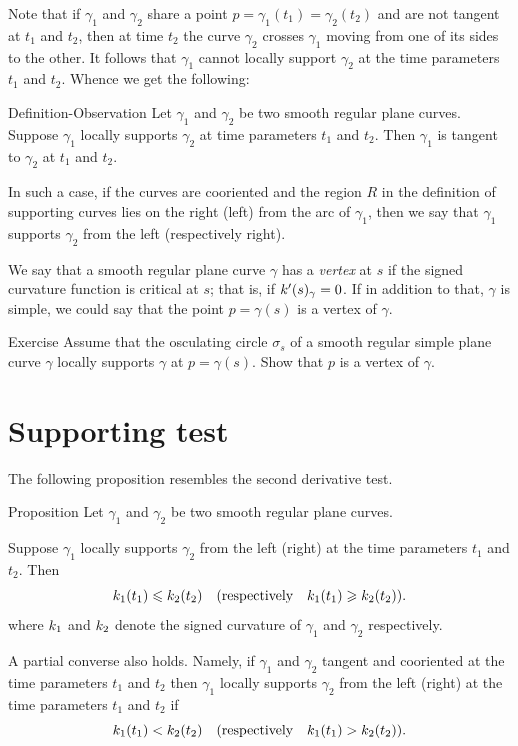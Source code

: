 Note that if $\gamma_1$ and $\gamma_2$ share a point $p=\gamma_1(t_1)=\gamma_2(t_2)$ and are not tangent at $t_1$ and $t_2$, then at time $t_2$ the curve $\gamma_2$ crosses $\gamma_1$  moving from one of its sides to the other.
It follows that $\gamma_1$ cannot locally support $\gamma_2$ at the time parameters $t_1$ and $t_2$.
Whence we get the following:

\begin{thm}{Definition-Observation}
Let $\gamma_1$ and $\gamma_2$ be two smooth regular plane curves.
Suppose $\gamma_1$ locally supports $\gamma_2$ at time parameters $t_1$ and $t_2$.
Then $\gamma_1$ is tangent to $\gamma_2$ at $t_1$ and $t_2$.

In such a case, if the curves are cooriented and the region $R$ in the definition of supporting curves lies on the right (left) from the arc of $\gamma_1$, then we say that 
$\gamma_1$ supports $\gamma_2$ from the left (respectively right).
\end{thm}

We say that a smooth regular plane curve $\gamma$ has a \emph{vertex} at $s$
if the signed curvature function is critical at $s$;
that is, if $k'(s)_\gamma=0$.
If in addition to that, $\gamma$ is simple, we could say that the point $p=\gamma(s)$ is a vertex of $\gamma$.

\begin{thm}{Exercise}\label{ex:vertex-support}
Assume that the osculating circle $\sigma_s$ of a smooth regular simple plane curve $\gamma$ locally supports $\gamma$ at $p=\gamma(s)$.
Show that $p$ is a vertex of $\gamma$.
\end{thm}

\section{Supporting test}

The following proposition resembles the second derivative test. 

\begin{thm}{Proposition}\label{prop:supporting-circline}
Let $\gamma_1$ and $\gamma_2$ be two smooth regular plane curves.

Suppose $\gamma_1$ locally supports $\gamma_2$ from the left (right) at the time parameters $t_1$ and $t_2$.
Then 
\[k_1(t_1)\leqslant k_2(t_2)\quad(\text{respectively}\quad k_1(t_1)\geqslant k_2(t_2)).\]
where $k_1$ and $k_2$ denote the signed curvature of $\gamma_1$ and $\gamma_2$ respectively.

A partial converse also holds.
Namely, if $\gamma_1$ and $\gamma_2$ tangent and cooriented at the time parameters $t_1$ and $t_2$
then $\gamma_1$ locally supports $\gamma_2$ from the left (right) at the time parameters $t_1$ and $t_2$
if 
\[k_1(t_1)< k_2(t_2)\quad(\text{respectively}\quad k_1(t_1)> k_2(t_2)).\]

\end{thm}

